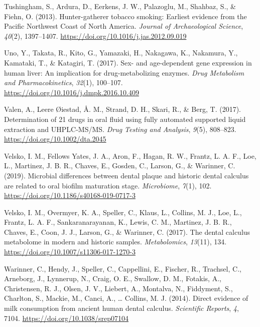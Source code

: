 \documentclass[
]{article}
\newlength{\cslhangindent}
\newenvironment{CSLReferences}[2] %
 {\begin{list}{}{%
  \setlength{\itemindent}{0pt}
  \setlength{\leftmargin}{0pt}
  \setlength{\parsep}{0pt}
  \ifodd #1
   \setlength{\leftmargin}{\cslhangindent}
   \setlength{\itemindent}{-1\cslhangindent}
  \fi
  \setlength{\itemsep}{#2\baselineskip}}}
 {\end{list}}
\begin{document}
\begin{CSLReferences}{1}{0}
Tushingham, S., Ardura, D., Eerkens, J. W., Palazoglu, M., Shahbaz, S.,
\& Fiehn, O. (2013). Hunter-gatherer tobacco smoking: Earliest evidence
from the {Pacific Northwest Coast} of {North America}. \emph{Journal of
Archaeological Science}, \emph{40}(2), 1397--1407.
\url{https://doi.org/10.1016/j.jas.2012.09.019}

Uno, Y., Takata, R., Kito, G., Yamazaki, H., Nakagawa, K., Nakamura, Y.,
Kamataki, T., \& Katagiri, T. (2017). Sex- and age-dependent gene
expression in human liver: {An} implication for drug-metabolizing
enzymes. \emph{Drug Metabolism and Pharmacokinetics}, \emph{32}(1),
100--107. \url{https://doi.org/10.1016/j.dmpk.2016.10.409}

Valen, A., Leere Øiestad, Å. M., Strand, D. H., Skari, R., \& Berg, T.
(2017). Determination of 21 drugs in oral fluid using fully automated
supported liquid extraction and {UHPLC-MS}/{MS}. \emph{Drug Testing and
Analysis}, \emph{9}(5), 808--823. \url{https://doi.org/10.1002/dta.2045}

Velsko, I. M., Fellows Yates, J. A., Aron, F., Hagan, R. W., Frantz, L.
A. F., Loe, L., Martinez, J. B. R., Chaves, E., Gosden, C., Larson, G.,
\& Warinner, C. (2019). Microbial differences between dental plaque and
historic dental calculus are related to oral biofilm maturation stage.
\emph{Microbiome}, \emph{7}(1), 102.
\url{https://doi.org/10.1186/s40168-019-0717-3}

Velsko, I. M., Overmyer, K. A., Speller, C., Klaus, L., Collins, M. J.,
Loe, L., Frantz, L. A. F., Sankaranarayanan, K., Lewis, C. M., Martinez,
J. B. R., Chaves, E., Coon, J. J., Larson, G., \& Warinner, C. (2017).
The dental calculus metabolome in modern and historic samples.
\emph{Metabolomics}, \emph{13}(11), 134.
\url{https://doi.org/10.1007/s11306-017-1270-3}

Warinner, C., Hendy, J., Speller, C., Cappellini, E., Fischer, R.,
Trachsel, C., Arneborg, J., Lynnerup, N., Craig, O. E., Swallow, D. M.,
Fotakis, A., Christensen, R. J., Olsen, J. V., Liebert, A., Montalva,
N., Fiddyment, S., Charlton, S., Mackie, M., Canci, A., \ldots{}
Collins, M. J. (2014). Direct evidence of milk consumption from ancient
human dental calculus. \emph{Scientific Reports}, \emph{4}, 7104.
\url{https://doi.org/10.1038/srep07104}


\end{CSLReferences}
\end{document}
